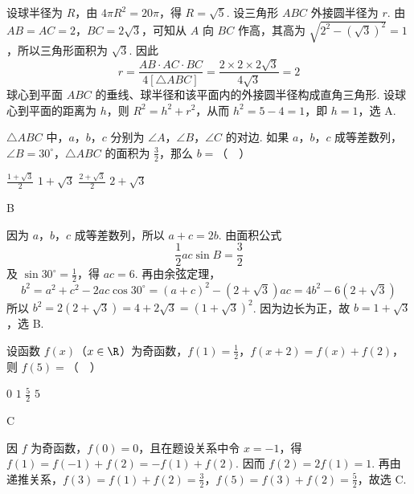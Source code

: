 \begin{solution}
设球半径为 \(R\)，由 \(4\pi R^2=20\pi\)，得 \(R=\sqrt5\). 设三角形 \(ABC\) 外接圆半径为 \(r\). 由 \(AB=AC=2\)，\(BC=2\sqrt3\)，可知从 \(A\) 向 \(BC\) 作高，其高为 \(\sqrt{2^2-(\sqrt3)^2}=1\)，所以三角形面积为 \(\sqrt3\). 因此
\[
r=\frac{AB\cdot AC\cdot BC}{4[\triangle ABC]}=\frac{2\times2\times2\sqrt3}{4\sqrt3}=2
\]
球心到平面 \(ABC\) 的垂线、球半径和该平面内的外接圆半径构成直角三角形. 设球心到平面的距离为 \(h\)，则 \(R^2=h^2+r^2\)，从而 \(h^2=5-4=1\)，即 \(h=1\)，选 A.
\end{solution}

\begin{problem}
\(\triangle ABC\) 中，\(a\)，\(b\)，\(c\) 分别为 \(\angle A\)，\(\angle B\)，\(\angle C\) 的对边. 如果 \(a\)，\(b\)，\(c\) 成等差数列，\(\angle B = 30^{\circ}\)，\(\triangle ABC\) 的面积为 \(\frac{3}{2}\)，那么 \(b =\)（\(\quad\)）

\choices
    {\(\frac{1 + \sqrt{3}}{2}\)}
    {\(1 + \sqrt{3}\)}
    {\(\frac{2 + \sqrt{3}}{2}\)}
    {\(2 + \sqrt{3}\)}
\end{problem}

\begin{answer}
B
\end{answer}

\begin{solution}
因为 \(a\)，\(b\)，\(c\) 成等差数列，所以 \(a+c=2b\). 由面积公式
\[
\frac12ac\sin B=\frac32
\]
及 \(\sin30^{\circ}=\frac12\)，得 \(ac=6\). 再由余弦定理，
\[
b^2=a^2+c^2-2ac\cos30^{\circ}
=(a+c)^2-(2+\sqrt3)ac
=4b^2-6(2+\sqrt3)
\]
所以 \(b^2=2(2+\sqrt3)=4+2\sqrt3=(1+\sqrt3)^2\). 因为边长为正，故 \(b=1+\sqrt3\)，选 B.
\end{solution}

\begin{problem}
设函数 \(f(x)\)（\(x \in \R\)）为奇函数，\(f(1) = \frac{1}{2}\)，\(f(x + 2) = f(x) + f(2)\)，则 \(f(5) =\)（\(\quad\)）

\choices
    {\(0\)}
    {\(1\)}
    {\( \frac{5}{2} \)}
    {\(5\)}
\end{problem}

\begin{answer}
C
\end{answer}

\begin{solution}
因 \(f\) 为奇函数，\(f(0)=0\)，且在题设关系中令 \(x=-1\)，得 \(f(1)=f(-1)+f(2)=-f(1)+f(2)\). 因而 \(f(2)=2f(1)=1\). 再由递推关系，\(f(3)=f(1)+f(2)=\frac32\)，\(f(5)=f(3)+f(2)=\frac52\)，故选 C.
\end{solution}

